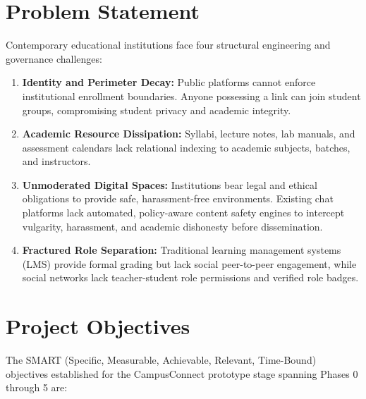 \documentclass[11pt,a4paper]{report}
\begin{document}
\section{Problem Statement}

Contemporary educational institutions face four structural engineering and governance challenges:

\begin{enumerate}
    \item \textbf{Identity and Perimeter Decay:} Public platforms cannot enforce institutional enrollment boundaries. Anyone possessing a link can join student groups, compromising student privacy and academic integrity.
    \item \textbf{Academic Resource Dissipation:} Syllabi, lecture notes, lab manuals, and assessment calendars lack relational indexing to academic subjects, batches, and instructors.
    \item \textbf{Unmoderated Digital Spaces:} Institutions bear legal and ethical obligations to provide safe, harassment-free environments. Existing chat platforms lack automated, policy-aware content safety engines to intercept vulgarity, harassment, and academic dishonesty before dissemination.
    \item \textbf{Fractured Role Separation:} Traditional learning management systems (LMS) provide formal grading but lack social peer-to-peer engagement, while social networks lack teacher-student role permissions and verified role badges.
\end{enumerate}

\section{Project Objectives}

The SMART (Specific, Measurable, Achievable, Relevant, Time-Bound) objectives established for the CampusConnect prototype stage spanning Phases 0 through 5 are:
\end{document}
